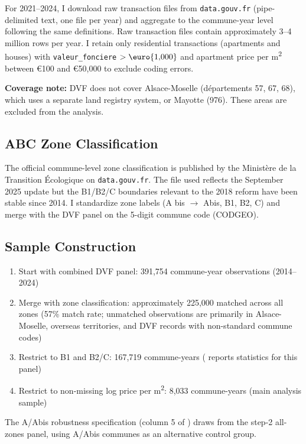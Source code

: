 \documentclass[12pt]{article}
\begin{document}
For 2021--2024, I download raw transaction files from \texttt{data.gouv.fr} (pipe-delimited text, one file per year) and aggregate to the commune-year level following the same definitions. Raw transaction files contain approximately 3--4 million rows per year. I retain only residential transactions (apartments and houses) with \texttt{valeur\_fonciere} $> \text{\euro{1,000}}$ and apartment price per m\textsuperscript{2} between \euro{100} and \euro{50,000} to exclude coding errors.

\textbf{Coverage note:} DVF does not cover Alsace-Moselle (d\'{e}partements 57, 67, 68), which uses a separate land registry system, or Mayotte (976). These areas are excluded from the analysis.

\subsection{ABC Zone Classification}

The official commune-level zone classification is published by the Minist\`{e}re de la Transition \'{E}cologique on \texttt{data.gouv.fr}. The file used reflects the September 2025 update but the B1/B2/C boundaries relevant to the 2018 reform have been stable since 2014. I standardize zone labels (A bis $\to$ Abis, B1, B2, C) and merge with the DVF panel on the 5-digit commune code (CODGEO).

\subsection{Sample Construction}

\begin{enumerate}
\item Start with combined DVF panel: 391,754 commune-year observations (2014--2024)
\item Merge with zone classification: approximately 225,000 matched across all zones (57\% match rate; unmatched observations are primarily in Alsace-Moselle, overseas territories, and DVF records with non-standard commune codes)
\item Restrict to B1 and B2/C: 167,719 commune-years ( reports statistics for this panel)
\item Restrict to non-missing log price per m\textsuperscript{2}: 8,033 commune-years (main analysis sample)
\end{enumerate}

The A/Abis robustness specification (column 5 of ) draws from the step-2 all-zones panel, using A/Abis communes as an alternative control group.
\end{document}
